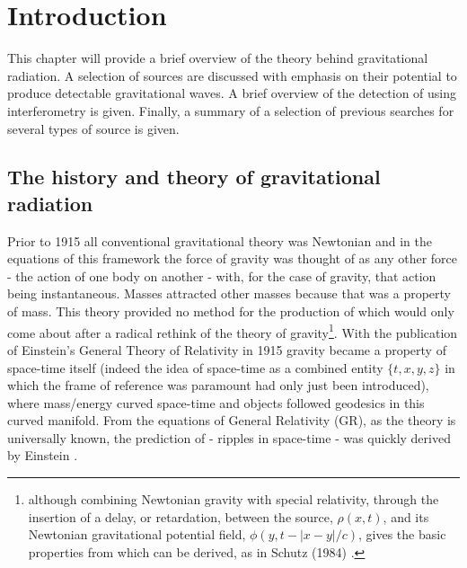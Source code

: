 

\chapter{Introduction}

This chapter will provide a brief overview of the theory behind gravitational radiation. A
selection of sources are discussed with emphasis on their potential to produce detectable
gravitational waves. A brief overview of the detection of \gws using interferometry is given.
Finally, a summary of a selection of previous searches for several types of \gw source is given.

\section{The history and theory of gravitational radiation}
Prior to 1915 all conventional gravitational theory was Newtonian and in the equations of this
framework the force of gravity was thought of as any other force - the action of one body on
another - with, for the case of gravity, that action being instantaneous. Masses attracted other
masses because that was a property of mass. This theory provided no method for the production of
\gws which would only come about after a radical rethink of the theory of gravity\footnote{although
combining Newtonian gravity with special relativity, through the insertion of a delay, or
retardation, between the source, $\rho{}(x,t)$, and its Newtonian gravitational potential field,
$\phi(y,t-|x-y|/c)$, gives the basic properties from which \gws can be derived, as in Schutz (1984)
\cite{Schutz:1984}.}. With the publication of Einstein's General Theory of Relativity in 1915
\cite{Einstein:1915} gravity became a property of space-time itself (indeed the idea of space-time
as a combined entity $\{t,x,y,z\}$ in which the frame of reference was paramount had only just been
introduced), where mass/energy curved space-time and objects followed geodesics in this curved
manifold. From the equations of General Relativity (GR), as the theory is universally known, the
prediction of \gws - ripples in space-time - was quickly derived by Einstein \cite{Einstein:1918}.

